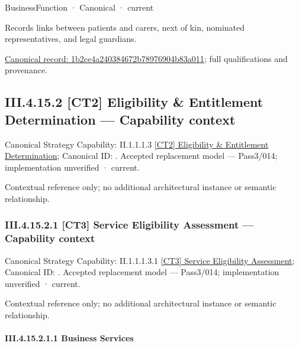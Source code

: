 \label{element:1b2ce4a240384672b78976904b83a011}
{\small BusinessFunction · Canonical · current}\par

Records links between patients and carers, next of kin, nominated representatives, and legal guardians.


{\footnotesize \href{../../../../../../../continuum/business/business-function/1b2ce4a240384672b78976904b83a011.md}{Canonical record: 1b2ce4a240384672b78976904b83a011}; full qualifications and provenance.}\par
\subsection*{III.4.15.2 [CT2] Eligibility \& Entitlement Determination — Capability context}
\label{navigation:III.4.15.2}

{\small Canonical Strategy Capability: II.1.1.1.3 \hyperref[element:2239340b964c49bab172d8c5cf4ba4cd]{[CT2] Eligibility \& Entitlement Determination}; Canonical ID: \texttt{}. Accepted replacement model — Pass3/014; implementation unverified · current.}\par
Contextual reference only; no additional architectural instance or semantic relationship.\par
\subsubsection*{III.4.15.2.1 [CT3] Service Eligibility Assessment — Capability context}
\label{navigation:III.4.15.2.1}

{\small Canonical Strategy Capability: II.1.1.1.3.1 \hyperref[element:94d9c75393684e638e5c3b1c83ed99be]{[CT3] Service Eligibility Assessment}; Canonical ID: \texttt{}. Accepted replacement model — Pass3/014; implementation unverified · current.}\par
Contextual reference only; no additional architectural instance or semantic relationship.\par
\paragraph*{III.4.15.2.1.1 Business Services}
\label{navigation:III.4.15.2.1.1}

